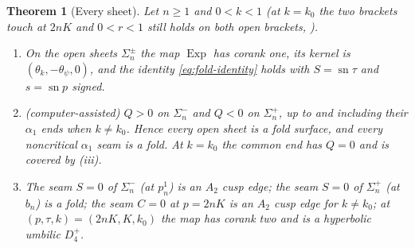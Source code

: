 \documentclass[11pt]{article}
\newtheorem{theorem}{Theorem}[section]
\theoremstyle{remark}
\newcommand{\sn}{\operatorname{sn}}
\newcommand{\Exp}{\operatorname{Exp}}
\begin{document}
\begin{theorem}[Every sheet]\label{thm:every-sheet}
Let $n\ge1$ and $0<k<1$ (at $k=k_0$ the two brackets touch at $2nK$ and
$0<r<1$ still holds on both open brackets,
\cite[Theorem 4.1]{SE2FirstConjugate}).
\begin{enumerate}[nosep,leftmargin=*]
\item[(i)] On the open sheets $\Sigma_n^\pm$ the map $\Exp$ has corank one,
      its kernel is $(\theta_k,-\theta_\psi,0)$, and the identity
      \eqref{eq:fold-identity} holds with $S=\sn\tau$ and $s=\sn p$ signed.
\item[(ii)] (computer-assisted) $Q>0$ on $\Sigma_n^-$ and $Q<0$ on $\Sigma_n^+$, up to and
      including their $\alpha_1$ ends when $k\ne k_0$.  Hence every open
      sheet is a fold surface, and every noncritical $\alpha_1$ seam is a fold.
      At $k=k_0$ the common end has $Q=0$ and is covered by (iii).
\item[(iii)] The seam $S=0$ of $\Sigma_n^-$ (at $p_n^1$) is an $A_2$ cusp
      edge; the seam $S=0$ of $\Sigma_n^+$ (at $b_n$) is a fold; the seam
      $C=0$ at $p=2nK$ is an $A_2$ cusp edge for $k\ne k_0$; at
      $(p,\tau,k)=(2nK,K,k_0)$ the map has corank two and is a hyperbolic
      umbilic $D_4^+$.
\end{enumerate}
\end{theorem}
\end{document}
